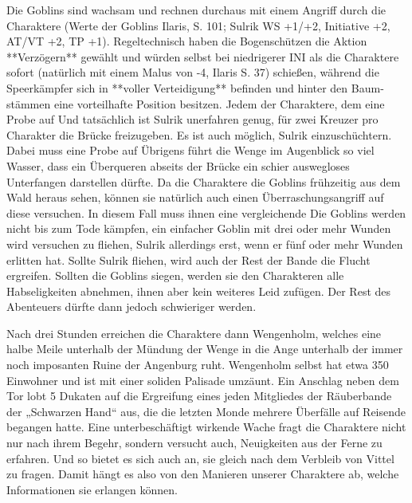 Die Goblins sind wachsam und rechnen durchaus mit einem Angriff durch die Charaktere (Werte der Goblins Ilaris, S. 101; Sulrik WS +1/+2, Initiative +2, AT/VT +2, TP +1). Regeltechnisch haben die Bogenschützen die Aktion **Verzögern** gewählt und würden selbst bei niedrigerer INI als die Charaktere sofort (natürlich mit einem Malus von -4, Ilaris S. 37) schießen, während die Speerkämpfer sich in **voller Verteidigung** befinden und hinter den Baum-stämmen eine vorteilhafte Position besitzen.
\platz
Jedem der Charaktere, dem eine Probe auf 
\platz
{}
\platz
Und tatsächlich ist Sulrik unerfahren genug, für zwei Kreuzer pro Charakter die Brücke freizugeben. Es ist auch möglich, Sulrik einzuschüchtern. Dabei muss eine Probe auf
\platz
{}
\platz
Übrigens führt die Wenge im Augenblick so viel Wasser, dass ein Überqueren abseits der Brücke ein schier auswegloses Unterfangen darstellen dürfte. 
\platz
Da die Charaktere die Goblins frühzeitig aus dem Wald heraus sehen, können sie natürlich auch einen Überraschungsangriff auf diese versuchen. In diesem Fall muss ihnen eine vergleichende 
\platz
{}
\platz
{}
\platz
Die Goblins werden nicht bis zum Tode kämpfen, ein einfacher Goblin mit drei oder mehr Wunden wird versuchen zu fliehen, Sulrik allerdings erst, wenn er fünf oder mehr Wunden erlitten hat. Sollte Sulrik fliehen, wird auch der Rest der Bande die Flucht ergreifen. Sollten die Goblins siegen, werden sie den Charakteren alle Habseligkeiten abnehmen, ihnen aber kein weiteres Leid zufügen. Der Rest des Abenteuers dürfte dann jedoch schwieriger werden. 





\platz
Nach drei Stunden erreichen die Charaktere dann Wengenholm, welches eine halbe Meile unterhalb der Mündung der Wenge in die Ange unterhalb der immer noch imposanten Ruine der Angenburg ruht. Wengenholm selbst hat etwa 350 Einwohner und ist mit einer soliden Palisade umzäunt. Ein Anschlag neben dem Tor lobt 5 Dukaten auf die Ergreifung eines jeden Mitgliedes der Räuberbande der „Schwarzen Hand“ aus, die die letzten Monde mehrere Überfälle auf Reisende begangen hatte. Eine unterbeschäftigt wirkende Wache fragt die Charaktere nicht nur nach ihrem Begehr, sondern versucht auch, Neuigkeiten aus der Ferne zu erfahren. Und so bietet es sich auch an, sie gleich nach dem Verbleib von Vittel zu fragen. Damit hängt es also von den Manieren unserer Charaktere ab, welche Informationen sie erlangen können. 


